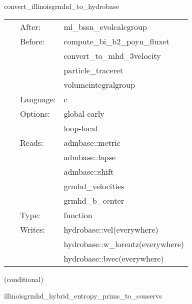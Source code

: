 \hspace{5mm} convert\_illinoisgrmhd\_to\_hydrobase 

\hspace{5mm}{\it convert illinoisgrmhd-native variables to hydrobase } 


\hspace{5mm}

 \begin{tabular*}{160mm}{cll} 
~ & After:  & ml\_bssn\_evolcalcgroup \\ 
~ & Before:  & compute\_bi\_b2\_poyn\_fluxet \\ 
~& ~ &convert\_to\_mhd\_3velocity\\ 
~& ~ &particle\_traceret\\ 
~& ~ &volumeintegralgroup\\ 
~ & Language:  & c \\ 
~ & Options:  & global-early \\ 
~& ~ &loop-local\\ 
~ & Reads:  & admbase::metric \\ 
~& ~ &admbase::lapse\\ 
~& ~ &admbase::shift\\ 
~& ~ &grmhd\_velocities\\ 
~& ~ &grmhd\_b\_center\\ 
~ & Type:  & function \\ 
~ & Writes:  & hydrobase::vel(everywhere) \\ 
~& ~ &hydrobase::w\_lorentz(everywhere)\\ 
~& ~ &hydrobase::bvec(everywhere)\\ 
\end{tabular*} 


\vspace{5mm}

   (conditional) 

\hspace{5mm} illinoisgrmhd\_hybrid\_entropy\_prims\_to\_conservs 

\hspace{5mm}{\it entropy+hybrid version of illinoisgrmhd\_prims\_to\_conservs } 


\hspace{5mm}

